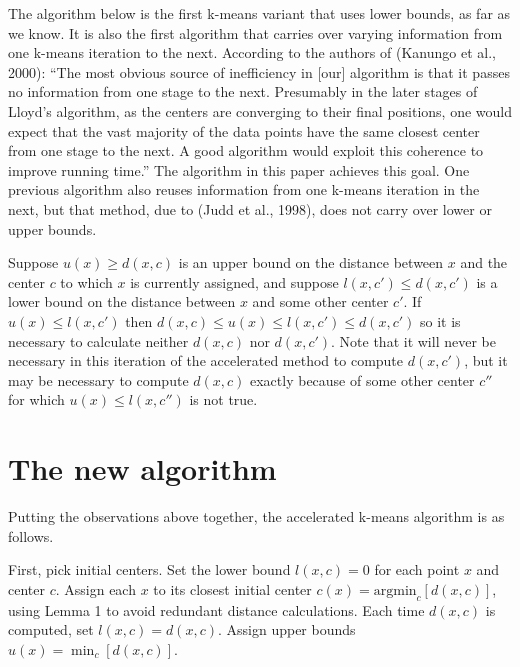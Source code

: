 The algorithm below is the first k-means variant that uses lower bounds, as far as we know. It is also the first algorithm that carries over varying information from one k-means iteration to the next. According to the authors of (Kanungo et al., 2000): ``The most obvious source of inefficiency in [our] algorithm is that it passes no information from one stage to the next. Presumably in the later stages of Lloyd's algorithm, as the centers are converging to their final positions, one would expect that the vast majority of the data points have the same closest center from one stage to the next. A good algorithm would exploit this coherence to improve running time.'' The algorithm in this paper achieves this goal. One previous algorithm also reuses information from one k-means iteration in the next, but that method, due to (Judd et al., 1998), does not carry over lower or upper bounds.

Suppose \( u(x) \ge d(x, c) \) is an upper bound on the distance between \( x \) and the center \( c \) to which \( x \) is currently assigned, and suppose \( l(x, c') \le d(x, c') \) is a lower bound on the distance between \( x \) and some other center \( c' \). If \( u(x) \le l(x, c') \) then \( d(x, c) \le u(x) \le l(x, c') \le d(x, c') \) so it is necessary to calculate neither \( d(x, c) \) nor \( d(x, c') \). Note that it will never be necessary in this iteration of the accelerated method to compute \( d(x, c') \), but it may be necessary to compute \( d(x, c) \) exactly because of some other center \( c'' \) for which \( u(x) \le l(x, c'') \) is not true.

\chapter{The new algorithm}
Putting the observations above together, the accelerated k-means algorithm is as follows.

First, pick initial centers. Set the lower bound \( l(x, c) = 0 \) for each point \( x \) and center \( c \). Assign each \( x \) to its closest initial center \( c(x) = \mathrm{argmin}_c \left[d(x, c)\right] \), using Lemma 1 to avoid redundant distance calculations. Each time \( d(x, c) \) is computed, set \( l(x, c) = d(x, c) \). Assign upper bounds \( u(x) = \min_c \left[d(x, c)\right] \).

